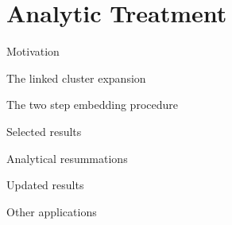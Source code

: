 \section{Analytic Treatment}

\begin{frame}{Motivation}
  
\end{frame}

\begin{frame}{The linked cluster expansion}
  
\end{frame}

\begin{frame}{The two step embedding procedure}
  
\end{frame}

\begin{frame}{Selected results}
  
\end{frame}

\begin{frame}{Analytical resummations}
  
\end{frame}

\begin{frame}{Updated results}
  
\end{frame}

\begin{frame}{Other applications}
  
\end{frame}
